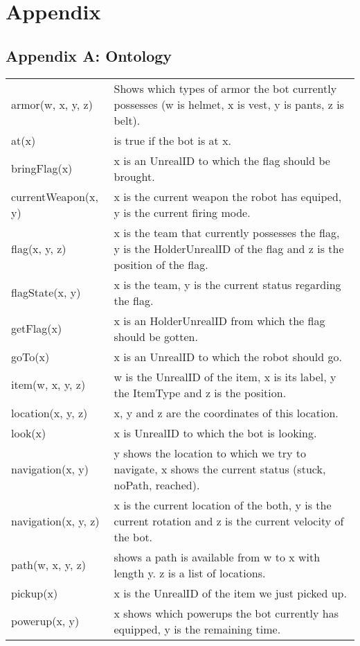 \part{Appendix}
%

\chapter*{Appendix A: Ontology}
\begin{tabular}{ l | p{12cm}}
  armor(w, x, y, z) & Shows which types of armor the bot currently possesses (w is helmet, x is vest, y is pants, z is belt). \\
  at(x) & is true if the bot is at x. \\
  bringFlag(x) & x is an UnrealID to which the flag should be brought. \\
  currentWeapon(x, y) & x is the current weapon the robot has equiped, y is the current firing mode. \\
  flag(x, y, z) & x is the team that currently possesses the flag, y is the HolderUnrealID of the flag and z is the position of the flag. \\
  flagState(x, y) & x is the team, y is the current status regarding the flag. \\
  getFlag(x) & x is an HolderUnrealID from which the flag should be gotten. \\
  goTo(x) & x is an UnrealID to which the robot should go. \\
  item(w, x, y, z) & w is the UnrealID of the item, x is its label, y the ItemType and z is the position. \\
  location(x, y, z) & x, y and z are the coordinates of this location. \\
  look(x) & x is UnrealID to which the bot is looking. \\
  navigation(x, y) & y shows the location to which we try to navigate, x shows the current status (stuck, noPath, reached). \\
  navigation(x, y, z) & x is the current location of the both, y is the current rotation and z is the current velocity of the bot. \\
  path(w, x, y, z) & shows a path is available from w to x with length y. z is a list of locations. \\
  pickup(x) & x is the UnrealID of the item we just picked up. \\
  powerup(x, y) & x shows which powerups the bot currently has equipped, y is the remaining time. \\

\end{tabular}
